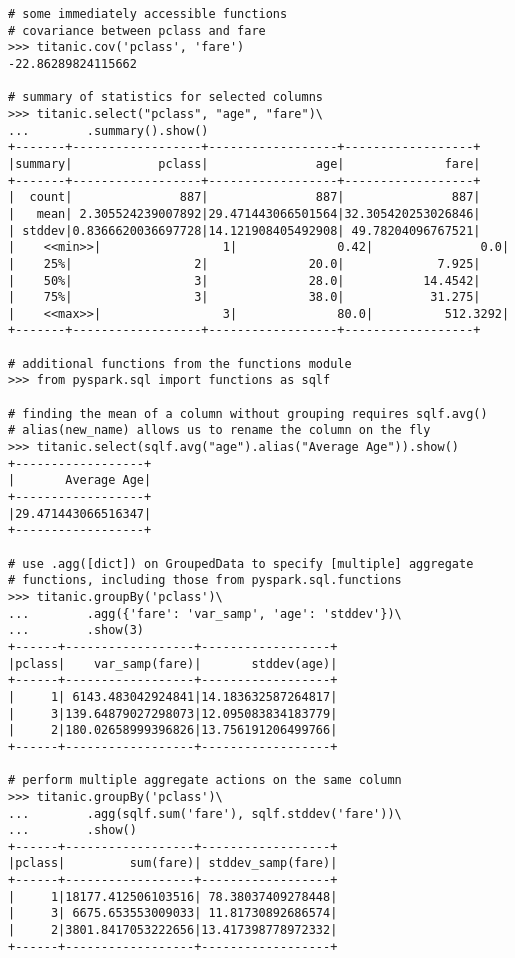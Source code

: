 \begin{lstlisting}
# some immediately accessible functions
# covariance between pclass and fare
>>> titanic.cov('pclass', 'fare')
-22.86289824115662

# summary of statistics for selected columns
>>> titanic.select("pclass", "age", "fare")\
...		   .summary().show()
+-------+------------------+------------------+------------------+
|summary|            pclass|               age|              fare|
+-------+------------------+------------------+------------------+
|  count|               887|               887|               887|
|   mean| 2.305524239007892|29.471443066501564|32.305420253026846|
| stddev|0.8366620036697728|14.121908405492908| 49.78204096767521|
|    <<min>>|                 1|              0.42|               0.0|
|    25%|                 2|              20.0|             7.925|
|    50%|                 3|              28.0|           14.4542|
|    75%|                 3|              38.0|            31.275|
|    <<max>>|                 3|              80.0|          512.3292|
+-------+------------------+------------------+------------------+

# additional functions from the functions module
>>> from pyspark.sql import functions as sqlf

# finding the mean of a column without grouping requires sqlf.avg()
# alias(new_name) allows us to rename the column on the fly
>>> titanic.select(sqlf.avg("age").alias("Average Age")).show()
+------------------+
|       Average Age|
+------------------+
|29.471443066516347|
+------------------+

# use .agg([dict]) on GroupedData to specify [multiple] aggregate
# functions, including those from pyspark.sql.functions
>>> titanic.groupBy('pclass')\
...        .agg({'fare': 'var_samp', 'age': 'stddev'})\
...        .show(3)
+------+------------------+------------------+
|pclass|    var_samp(fare)|       stddev(age)|
+------+------------------+------------------+
|     1| 6143.483042924841|14.183632587264817|
|     3|139.64879027298073|12.095083834183779|
|     2|180.02658999396826|13.756191206499766|
+------+------------------+------------------+

# perform multiple aggregate actions on the same column
>>> titanic.groupBy('pclass')\
...        .agg(sqlf.sum('fare'), sqlf.stddev('fare'))\
...        .show()
+------+------------------+------------------+
|pclass|         sum(fare)| stddev_samp(fare)|
+------+------------------+------------------+
|     1|18177.412506103516| 78.38037409278448|
|     3| 6675.653553009033| 11.81730892686574|
|     2|3801.8417053222656|13.417398778972332|
+------+------------------+------------------+

\end{lstlisting}

